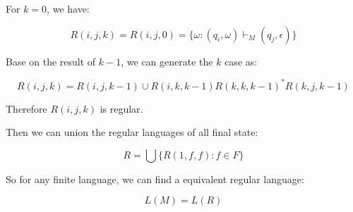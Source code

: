 \documentclass[paper=a4, fontsize=11pt]{scrartcl} %
\numberwithin{equation}{section} %
\numberwithin{figure}{section} %
\numberwithin{table}{section} %
\begin{document}
For $k=0$, we have:

$$R(i,j,k)=R(i,j,0)=\{\omega: (q_i,\omega) \vdash_M (q_j,\epsilon)\}$$

Base on the result of $k-1$, we can generate the $k$ case as:

$$R(i,j,k)=R(i,j,k-1)\cup R(i,k,k-1)R(k,k,k-1)^*R(k,j,k-1)$$

Therefore $R(i,j,k)$ is regular.

Then we can union the regular languages of all final state:

$$R=\bigcup\{R(1,f,f): f\in F\}$$

So for any finite language, we can find a equivalent regular language:

$$L(M)=L(R)$$
\end{document}
